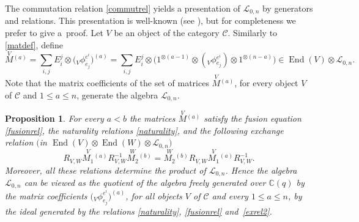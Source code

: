 \documentclass[pdftex]{sigma}%
\numberwithin{equation}{section}
\numberwithin{figure}{section}
\newtheorem{prop}[teo]{Proposition}
\newcommand{\mc}{\mathbb{C}}
\newcommand{\Ll}{{\mathcal L}}
\begin{document}
The commutation relation \eqref{commutrel} yields a presentation of $\Ll_{0,n}$ by generators and relations. This presentation is well-known (see \cite{AGS1,BR1, DKM,MW}), but for completeness we prefer to give a~proof. Let $V$ be an object of the category ${\mathcal C}$. Similarly to \eqref{matdef}, define
\[\stackrel{V}{M}{}^{\!\! (a)}=\sum_{i,j }E_i^j\otimes \big({}_V\phi^{e^i}_{e_j}\big)^{(a)} = \sum_{i,j }E_i^j\otimes \big(1^{\otimes (a-1)} \otimes ({}_V\phi{}^{e^i}_{e_j}) \otimes 1^{\otimes (n-a)}\big) \in \operatorname{End}(V)\otimes \Ll_{0,n}.\]
Note that the matrix coefficients of the set of matrices $\stackrel{V}{M}{}^{\!\! (a)}$, for every object $V$ of $\mathcal{C}$ and $1\leq a\leq n$, generate the algebra $\Ll_{0,n}$.
\begin{prop}\label{matrelL0n} For every $a<b$ the matrices $\stackrel{V}{M}{}^{\!\! (a)}$ satisfy the fusion equation \eqref{fusionrel}, the naturality relations \eqref{naturality}, and the following \emph{exchange relation} $($in $\operatorname{End}(V)\otimes \operatorname{End}(W) \otimes \Ll_{0,n})$
\begin{equation}\label{exrel2}
{R}_{V,W}\stackrel{V}{M_1}{}^{\!\!\! (a)} {R}_{V,W}^{-1}\stackrel{W}{M_2}{}^{\!\!\! (b)}= \stackrel{W}{M_2}{}^{\!\! (b)} {R}_{V,W}\stackrel{V}{M_1}{}^{\!\!\! (a)} R_{V,W}^{-1}.
\end{equation}
Moreover, all these relations determine the product of $\Ll_{0,n}$. Hence the algebra $\Ll_{0,n}$ can be viewed as the quotient of the algebra freely generated over $\mc(q)$ by the matrix coefficients $\big({}_V\phi^{e^i}_{e_j}\big)^{(a)}$, for all objects $V$ of $\mathcal{C}$ and every $1\leq a\leq n$, by the ideal generated by the relations \eqref{naturality}, \eqref{fusionrel} and~\eqref{exrel2}.
\end{prop}
\end{document}
